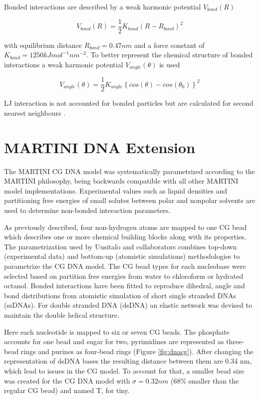 \documentclass[
	12pt,				%
	openright,			%
	twoside,			%
	a4paper,			%
	english,			%
	french,				%
	spanish,			%
	brazil,				%
	]{abntex2}
\begin{document}
Bonded interactions are described by a weak harmonic potential $V_{bond}(R)$

\begin{equation}
V_{bond}(R) = \frac{1}{2} K_{bond} \left ( R- R_{bond} \right )^2
\label{eq:03}
\end{equation}


with equilibrium distance $R_{bond} = 0.47 nm$ and a force constant of $K_{bond} = 1250 kJ mol^{-1} nm^{-2}$. To better represent the chemical structure of bonded interactions a weak harmonic potential $V_{angle}(\theta)$ is used 

\begin{equation}
V_{angle}(\theta ) = \frac{1}{2}K_{angle}\left \{ cos(\theta) -cos(\theta_{0}) \right \}^2
\label{eq:03}
\end{equation}

LJ interaction is not accounted for bonded particles but are calculated for second nearest neighbours \cite{Marrink2007}.

\section{MARTINI DNA Extension}

The MARTINI CG DNA model was systematically parametrized according to the MARTINI philosophy, being backwards compatible with all other MARTINI model implementations. Experimental values such as liquid densities and partitioning free energies of small solutes between polar and nonpolar solvents are used to determine non-bonded interaction parameters\cite{Uusitalo2015}.

As previously described, four non-hydrogen atoms are mapped to one CG bead which describes one or more chemical building blocks along with its properties. The parametrization used by Uusitalo and collaborators combines top-down (experimental data) and bottom-up (atomistic simulations) methodologies to parametrize the CG DNA model. The CG bead types for each nucleobase were selected based on partition free energies from water to chloroform or hydrated octanol. Bonded interactions have been fitted to reproduce dihedral, angle and bond distributions from atomistic simulation of short single stranded DNAs (ssDNAs). For double stranded DNA (dsDNA) an elastic network was devised to maintain the double helical structure.
	
Here each nucleotide is mapped to six or seven CG beads. The phosphate accounts for one bead and sugar for two, pyrimidines are represented as three-bead rings and purines as four-bead rings (Figure \ref{fig:dnacg}). After changing the representation of dsDNA bases the resulting distance between them are 0.34 nm, which lead to issues in the CG model. To account for that, a smaller bead size was created for the CG DNA model with $\sigma = 0.32nm$ (68\% smaller than the regular CG bead) and named T, for tiny. 
\end{document}
